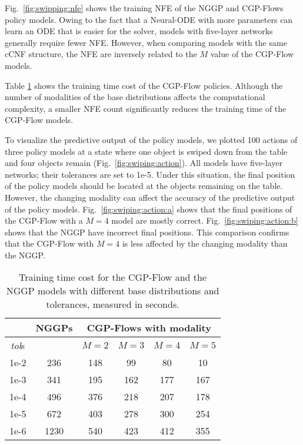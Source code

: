 \documentclass[sn-mathphys-num]{sn-jnl}
\begin{document}
Fig.~\ref{fig:swipping:nfe} shows the training NFE of the NGGP and CGP-Flows policy models.
Owing to the fact that a Neural-ODE with more parameters can learn an ODE that is easier for the solver, models with five-layer networks generally require fewer NFE. However, when comparing models with the same cCNF structure, the NFE are inversely related to the $M$ value of the CGP-Flow models.

Table \ref{tab:time:cost} shows the training time cost of the CGP-Flow policies.
Although the number of modalities of the base distributions affects the computational complexity, a smaller NFE count significantly reduces the training time of the CGP-Flow models.

To visualize the predictive output of the policy models, we plotted 100 actions of three policy models at a state where one object is swiped down from the table and four objects remain (Fig.~\ref{fig:swiping:action}). All models have five-layer networks; their tolerances are set to 1e-5.
Under this situation, the final position of the policy models should be located at the objects remaining on the table.
However, the changing modality can affect the accuracy of the predictive output of the policy models.
Fig.~\ref{fig:swiping:action:a} shows that the final positions of the CGP-Flow with a $M=4$ model are mostly correct.
Fig.~\ref{fig:swiping:action:b} shows that the NGGP have incorrect final positions. 
This comparison confirms that the CGP-Flow with $M=4$ is less affected by the changing modality than the NGGP. 


\begin{table}[t]
    \centering
    \renewcommand{\arraystretch}{1.1}
    \caption{Training time cost for the CGP-Flow and the NGGP models with different base distributions and tolerances, measured in seconds.}
    \label{tab:time:cost}
    \begin{tabular}{|c||c|c|c|c|c|} \hline
                      & NGGPs & \multicolumn{4}{c|}{CGP-Flows with modality} \\ \hline
        \textit{tol}s &       & $M=2$ & $M=3$ & $M=4$ & $M=5$ \\ \hline\hline
        1e-2 & 236   & 148   & 99    & 80    & 10  \\ \hline
        1e-3 & 341   & 195   & 162   & 177   & 167 \\ \hline
        1e-4 & 496   & 376   & 218   & 207   & 178 \\ \hline
        1e-5 & 672   & 403   & 278   & 300   & 254 \\ \hline
        1e-6 & 1230  & 540   & 423   & 412   & 355 \\ \hline
    \end{tabular}
\end{table}
\end{document}
